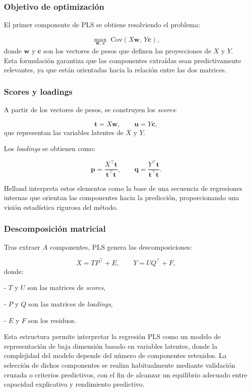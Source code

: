 \documentclass[12pt,a4paper]{report}
\begin{document}
\subsubsection*{Objetivo de optimización}

El primer componente de PLS se obtiene resolviendo el problema:

\[
\max_{\mathbf{w},\,\mathbf{c}} \; \mathrm{Cov}(X\mathbf{w},\,Y\mathbf{c}),
\]
donde \(\mathbf{w}\) y \(\mathbf{c}\) son los vectores de pesos que definen las proyecciones de \(X\) y \(Y\). Esta formulación garantiza que las componentes extraídas sean predictivamente relevantes, ya que están orientadas hacia la relación entre las dos matrices.

\subsubsection*{Scores y loadings}

A partir de los vectores de pesos, se construyen los \textit{scores}:

\[
\mathbf{t} = X\mathbf{w}, \qquad \mathbf{u} = Y\mathbf{c},
\]
que representan las variables latentes de \(X\) y \(Y\).

Los \textit{loadings} se obtienen como:

\[
\mathbf{p} = \frac{X^\top \mathbf{t}}{\mathbf{t}^\top \mathbf{t}}, 
\qquad 
\mathbf{q} = \frac{Y^\top \mathbf{t}}{\mathbf{t}^\top \mathbf{t}}.
\]

Helland \cite{helland1988} interpreta estos elementos como la base de una secuencia de regresiones internas que orientan las componentes hacia la predicción, proporcionando una visión estadística rigurosa del método.

\subsubsection*{Descomposición matricial}

Tras extraer \(A\) componentes, PLS genera las descomposiciones:

\[
X = T P^\top + E, \qquad Y = U Q^\top + F,
\]
donde:

- \(T\) y \(U\) son las matrices de \textit{scores},

- \(P\) y \(Q\) son las matrices de \textit{loadings},

- \(E\) y \(F\) son los residuos.

Esta estructura permite interpretar la regresión PLS como un modelo de representación de baja dimensión basado en variables latentes, donde la complejidad del modelo depende del número de componentes retenidos. La selección de dichos componentes se realiza habitualmente mediante validación cruzada o criterios predictivos, con el fin de alcanzar un equilibrio adecuado entre capacidad explicativa y rendimiento predictivo.
\end{document}
